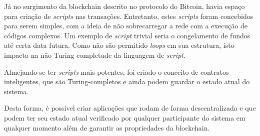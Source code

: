 \documentclass{ufsctex/ufsctex}
\begin{document}
Já no surgimento da blockchain descrito no protocolo do Bitcoin, havia espaço para 
criação de \textit{scripts} nas transações. Entretanto, estes \textit{scripts} foram concebidos
para serem simples, com a ideia de não sobrecarregar a rede com a execução de códigos
complexos. Um exemplo de \textit{script} trivial seria o congelamento de fundos até
certa data futura. Como não são  permitido \textit{loops} em sua estrutura, isto impacta
na não Turing completude da linguagem de \textit{script}.\cite{nakamoto2012bitcoin}

Almejando-se ter \textit{scripts} mais potentes, foi criado o conceito de contratos
inteligentes, que são Turing-completos e ainda podem guardar o estado atual do sistema.\cite{ethereum}

Desta forma, é possível criar aplicações que rodam de forma descentralizada e que podem
ter seu estado atual verificado por qualquer participante do sistema em qualquer
momento além de garantir as propriedades da blockchain.



\end{document}
